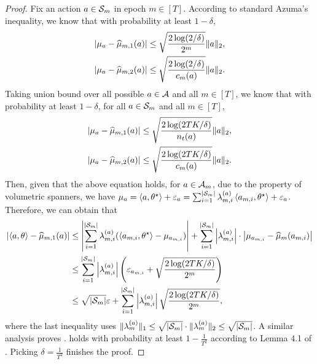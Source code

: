 \begin{proof}
    Fix an action $a\in {\mathcal{S}}_m$ in epoch $m\in[T]$. According to standard Azuma's inequality, we know that with probability at least $1-\delta$,
    \begin{align*}
        \left|\mu_a-\widehat{\mu}_{m,1}(a)\right|&\leq \sqrt{\frac{2\log(2/\delta)}{2^m}}\|a\|_2,\\
        \left|\mu_a-\widehat{\mu}_{m,2}(a)\right|&\leq \sqrt{\frac{2\log(2/\delta)}{c_m(a)}}\|a\|_2.
    \end{align*}
    Taking union bound over all possible $a\in {\mathcal{A}}$ and all $m\in[T]$, we know that with probability at least $1-\delta$, for all $a\in {\mathcal{S}}_m$ and all $m\in [T]$,
    \begin{align*}
        \left|\mu_a-\widehat{\mu}_{m,1}(a)\right|&\leq \sqrt{\frac{2\log(2TK/\delta)}{n_t(a)}}\|a\|_2,\\
        \left|\mu_a-\widehat{\mu}_{m,2}(a)\right|&\leq \sqrt{\frac{2\log(2TK/\delta)}{c_m(a)}}\|a\|_2.
    \end{align*}
    Then, given that the above equation holds, for $a\in {\mathcal{A}}_m$, due to the property of volumetric spanners, we have $\mu_a = \left\langle {a,\theta^\star} \right\rangle+\varepsilon_a =  \sum_{i=1}^{|{\mathcal{S}}_m|}\lambda_{m,i}^{(a)}\left\langle {a_{m,i},\theta^\star} \right\rangle+ \varepsilon_a$. Therefore, we can obtain that
    \begin{align*}
        \left|\left\langle {a,\theta} \right\rangle-\widehat{\mu}_{m,1}(a)\right|
        &\leq \left|\sum_{i=1}^{|{\mathcal{S}}_m|}\lambda_{m,i}^{(a)}(\left\langle {a_{m,i},\theta^\star} \right\rangle-\mu_{a_{m,i}})\right| + \sum_{i=1}^{|{\mathcal{S}}_m|}\left|\lambda_{m,i}^{(a)}\right|\cdot\left|\mu_{a_{m,i}}-\widehat{\mu}_{m}(a_{m,i})\right| \\
        &\leq \sum_{i=1}^{|{\mathcal{S}}_m|}\left|\lambda_{m,i}^{(a)}\right|\left(\varepsilon_{a_{m,i}}+\sqrt{\frac{2\log(2TK/\delta)}{2^{m}}}\right) \\
        &\leq \sqrt{|{\mathcal{S}}_m|}\varepsilon + \sum_{i=1}^{|{\mathcal{S}}_m|}\left|\lambda_{m,i}^{(a)}\right|\sqrt{\frac{2\log(2TK/\delta)}{2^{m}}},
    \end{align*}
    where the last inequality uses $\|\lambda_{m}^{(a)}\|_1\leq \sqrt{|{\mathcal{S}}_m|}\cdot \|\lambda_{m}^{(a)}\|_2\leq \sqrt{|{\mathcal{S}}_m|}$. A similar analysis proves .  holds with probability at least $1-\frac{1}{T^2}$ according to Lemma 4.1 of \citep{schlisselberg2024delay}. Picking $\delta = \frac{1}{T^2}$ finishes the proof.
\end{proof}

